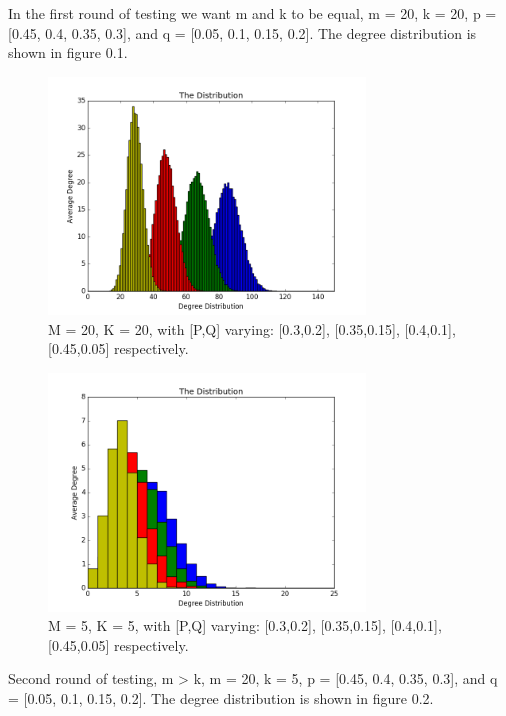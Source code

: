 \documentclass[paper=a4, fontsize=11pt]{scrartcl}
\numberwithin{equation}{section}		%
\numberwithin{figure}{section}			%
\numberwithin{table}{section}				%
\begin{document}
In the first round of testing we want m and k to be equal, m = 20, k = 20, p = [0.45, 0.4, 0.35, 0.3], and q = [0.05, 0.1, 0.15, 0.2]. The degree distribution is shown in figure 0.1.

\begin{figure}[p]
\center
\caption{M = 20, K = 20, with [P,Q] varying: [0.3,0.2], [0.35,0.15], [0.4,0.1], [0.45,0.05] respectively.}
\includegraphics[width=0.75\textwidth]{pictures/m=k.png}
\end{figure}

\begin{figure}[p]
\center
\caption{M = 5, K = 5, with [P,Q] varying: [0.3,0.2], [0.35,0.15], [0.4,0.1], [0.45,0.05] respectively.}
\includegraphics[width=0.75\textwidth]{pictures/k=m.png}
\end{figure}

Second round of testing, m > k, m = 20, k = 5, p = [0.45, 0.4, 0.35, 0.3], and q = [0.05, 0.1, 0.15, 0.2]. The degree distribution is shown in figure 0.2.
\end{document}
